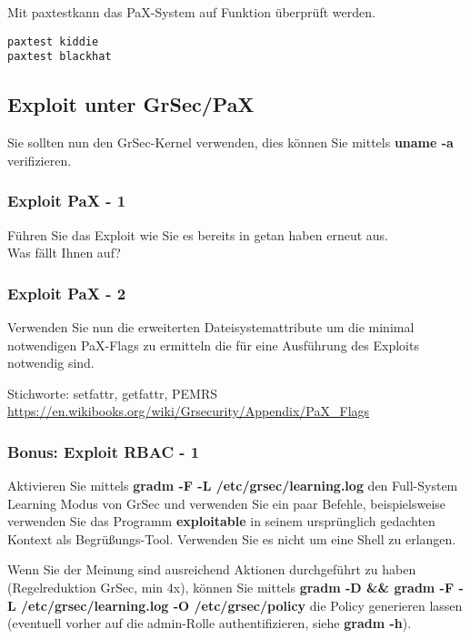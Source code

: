 Mit \glqq paxtest\grqq kann das PaX-System auf Funktion überprüft werden.
\begin{lstlisting}[numbers=none, frame=single, lineskip={-2.5pt}]
paxtest kiddie
paxtest blackhat
\end{lstlisting}


\subsection{Exploit unter GrSec/PaX}
\label{subsec:Exploit unter GrSec/PaX}

Sie sollten nun den GrSec-Kernel verwenden, dies können Sie mittels \textbf{uname -a} verifizieren.

\subsubsection{Exploit PaX - 1}
\label{subsubsec:Exploit PaX - 1}
Führen Sie das Exploit wie Sie es bereits in  getan haben erneut aus.\\
Was fällt Ihnen auf?

\subsubsection{Exploit PaX - 2}
\label{subsubsec:Exploit PaX - 2}
Verwenden Sie nun die erweiterten Dateisystemattribute um die minimal notwendigen PaX-Flags zu ermitteln die für eine Ausführung des Exploits notwendig sind.

Stichworte: setfattr, getfattr, PEMRS
\url{https://en.wikibooks.org/wiki/Grsecurity/Appendix/PaX_Flags}

\subsubsection{Bonus: Exploit RBAC - 1}
\label{subsubsec:Bonus: Exploit RBAC - 1}

Aktivieren Sie mittels \textbf{gradm -F -L /etc/grsec/learning.log} den Full-System Learning Modus von GrSec und verwenden Sie ein paar Befehle, beispielsweise verwenden Sie das Programm \textbf{exploitable} in seinem ursprünglich gedachten Kontext als Begrüßungs-Tool. Verwenden Sie es nicht um eine Shell zu erlangen.

Wenn Sie der Meinung sind ausreichend Aktionen durchgeführt zu haben (Regelreduktion GrSec, min 4x), können Sie mittels \textbf{gradm -D \&\& gradm -F -L /etc/grsec/learning.log -O /etc/grsec/policy} die Policy generieren lassen (eventuell vorher auf die admin-Rolle authentifizieren, siehe \textbf{gradm -h}).

